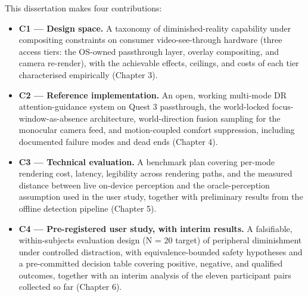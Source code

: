 This dissertation makes four contributions:

\begin{itemize}
\item \textbf{C1 — Design space.} A taxonomy of diminished-reality capability under compositing constraints on
  consumer video-see-through hardware (three access tiers: the OS-owned passthrough layer, overlay
  compositing, and camera re-render), with the achievable effects, ceilings, and costs of each tier
  characterised empirically (Chapter 3).

\item \textbf{C2 — Reference implementation.} An open, working multi-mode DR attention-guidance system on
  Quest 3 passthrough,  the world-locked focus-window-as-absence architecture, world-direction fusion
  sampling for the monocular camera feed, and motion-coupled comfort suppression, including
  documented failure modes and dead ends (Chapter 4).

\item \textbf{C3 — Technical evaluation.} A benchmark plan covering per-mode rendering cost, latency,
  legibility across rendering paths, and the measured distance between live on-device perception and
  the oracle-perception assumption used in the user study, together with preliminary results from the
  offline detection pipeline (Chapter 5).

\item \textbf{C4 — Pre-registered user study, with interim results.} A falsifiable, within-subjects
  evaluation design (N = 20 target) of peripheral diminishment under controlled distraction, with
  equivalence-bounded safety hypotheses and a pre-committed decision table covering positive,
  negative, and qualified outcomes, together with an interim analysis of the eleven participant pairs
  collected so far (Chapter 6).
\end{itemize}

\newpage
